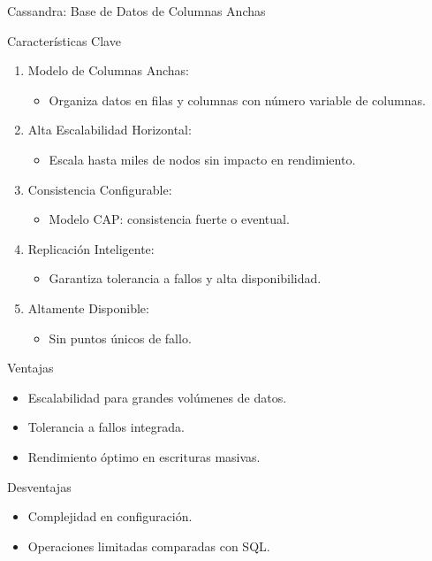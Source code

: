 \documentclass[presentation]{beamer}
\begin{document}
\begin{frame}[label={sec:org43493f4}]{Cassandra: Base de Datos de Columnas Anchas}
\begin{block}{Características Clave}
\begin{enumerate}
\item \alert{\alert{Modelo de Columnas Anchas}}:
\begin{itemize}
\item Organiza datos en filas y columnas con número variable de columnas.
\end{itemize}
\item \alert{\alert{Alta Escalabilidad Horizontal}}:
\begin{itemize}
\item Escala hasta miles de nodos sin impacto en rendimiento.
\end{itemize}
\item \alert{\alert{Consistencia Configurable}}:
\begin{itemize}
\item Modelo CAP: consistencia fuerte o eventual.
\end{itemize}
\item \alert{\alert{Replicación Inteligente}}:
\begin{itemize}
\item Garantiza tolerancia a fallos y alta disponibilidad.
\end{itemize}
\item \alert{\alert{Altamente Disponible}}:
\begin{itemize}
\item Sin puntos únicos de fallo.
\end{itemize}
\end{enumerate}
\end{block}

\begin{block}{Ventajas}
\begin{itemize}
\item Escalabilidad para grandes volúmenes de datos.
\item Tolerancia a fallos integrada.
\item Rendimiento óptimo en escrituras masivas.
\end{itemize}
\end{block}

\begin{block}{Desventajas}
\begin{itemize}
\item Complejidad en configuración.
\item Operaciones limitadas comparadas con SQL.
\end{itemize}
\end{block}


\end{frame}
\end{document}
